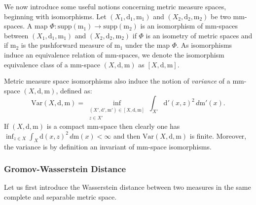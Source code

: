 \documentclass[pdflatex,sn-mathphys-ay]{sn-jnl}%
\newtheorem{proposition}{Proposition}[section]
\newcommand{\spa}{X}
\newcommand{\mes}{\mathrm{m}}
\newcommand{\dis}{\mathrm{d}}
\newcommand{\supp}{\mathrm{supp}}
\newcommand{\var}{\mathrm{Var}}
\newcommand{\change}[1]{\noindent #1}
\theoremstyle{thmstyleone}%
\begin{document}
\change{We now introduce some useful notions concerning metric measure spaces, beginning with isomorphisms.} Let $(\spa_1,\dis_1,\mes_1)$ and $(\spa_2,\dis_2,\mes_2)$ be two mm-spaces. \change{A} map $\Phi\colon\supp(\mes_1)\rightarrow\supp(\mes_2)$ is an isomorphism of mm-spaces between $(\spa_1,\dis_1,\mes_1)$ and $(\spa_2,\dis_2,\mes_2)$ if $\Phi$ is an isometry of metric spaces
    and if $\mes_2$ is the pushforward measure of $\mes_1$ under the map $\Phi$.
As isomorphisms induce an equivalence relation of mm-spaces, we denote the isomorphism equivalence class of a mm-space $(\spa,\dis,\mes)$ as $[\spa,\dis,\mes]$.




Metric measure space isomorphisms also induce the notion of {\it variance} of a mm-space $(\spa,\dis,\mes)$, defined as:
$$\var(\spa,\dis,\mes)=\inf_{\substack{(\spa',\dis',\mes')\in [\spa,\dis,\mes]\\ z\in \spa'}}\int_{\spa'}\dis'(x,z)^2\,d\mes'(x).$$
If $(\spa,\dis,\mes)$ is a compact mm-space then clearly one has $\inf_{z\in \spa}\int_{\spa}\dis(x,z)^2\,d\mes(x) < \infty $ and then $\var(\spa,\dis,\mes)$ is finite. Moreover, the variance is by definition an invariant of mm-space isomorphisms.

 




\subsubsection{Gromov-Wasserstein Distance}
\change{Let us first introduce the Wasserstein distance between two measures in the same complete and separable metric space.}
\end{document}
